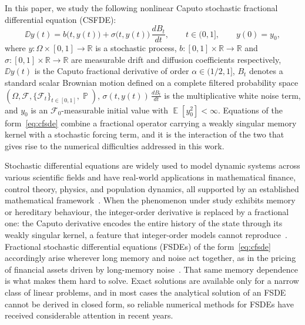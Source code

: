 \documentclass[11pt, a4paper]{article}
\theoremstyle{theoremstyle}
\theoremstyle{definitionstyle}
\DeclareMathOperator{\PP}{\mathbb P}
\DeclareMathOperator{\EE}{\mathbb E}
\newcommand{\sdv}{\frac{dB_t}{dt}}
\begin{document}
In this paper, we study the following nonlinear Caputo stochastic fractional differential equation (CSFDE):
\begin{equation}\label{eq:cfsde}
    \DD y(t) = b\bigl(t,y(t)\bigr) + \sigma\bigl(t,y(t)\bigr)\,\sdv,
    \qquad t\in(0,1],\qquad y(0)=y_0,
\end{equation}
where $y \colon \Omega\times[0,1]\to\mathbb{R}$ is a stochastic process, $b:[0,1]\times\mathbb{R}\to\mathbb{R}$ and $\sigma:[0,1]\times\mathbb{R}\to\mathbb{R}$ are measurable drift and diffusion coefficients respectively, $\DD y(t)$ is the Caputo fractional derivative of order
$\alpha\in(1/2,1]$,
$B_t$ denotes a standard scalar Brownian motion defined on a complete
filtered probability space
$(\Omega,\mathcal{F},\{\mathcal{F}_t\}_{t\in[0,1]},\PP)$,
$\sigma(t,y(t))\,\sdv$ is the multiplicative white noise term, and
$y_0$ is an $\mathcal{F}_0$-measurable initial value with
$\EE[y_0^2]<\infty$. Equations of the form~\eqref{eq:cfsde} combine a fractional operator carrying a weakly singular memory kernel with a stochastic forcing term, and it is the interaction of the two that gives rise to the numerical difficulties addressed in this work.

Stochastic differential equations are widely used to model dynamic systems
across various scientific fields and have real-world applications in
mathematical finance, control theory, physics, and population dynamics, all
supported by an established mathematical
framework~\cite{oksendal2003stochastic}. When the phenomenon under study exhibits
memory or hereditary behaviour, the integer-order derivative is replaced by a
fractional one: the Caputo derivative encodes the entire history of the state
through its weakly singular kernel, a feature that integer-order models cannot
reproduce~\cite{podlubny1999}. Fractional stochastic differential equations
(FSDEs) of the form~\eqref{eq:cfsde} accordingly arise wherever long memory and
noise act together, as in the pricing of financial assets driven by long-memory
noise~\cite{tien2013}. That same memory dependence is what makes them hard to
solve. Exact solutions are available only for a narrow class of linear problems,
and in most cases the analytical solution of an FSDE cannot be derived in closed
form, so reliable numerical methods for FSDEs have received considerable
attention in recent years.
\end{document}
